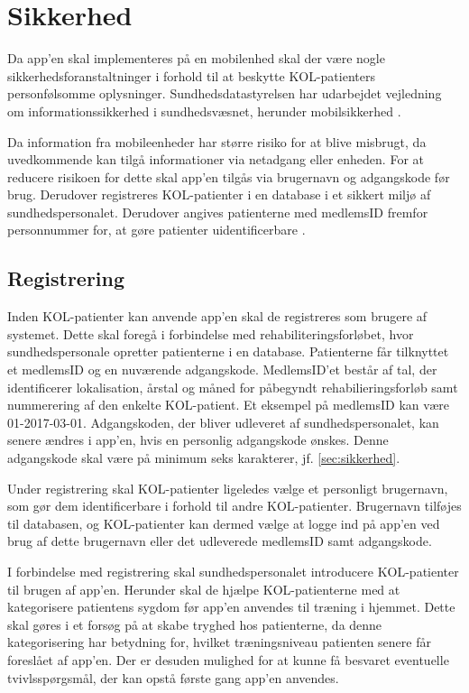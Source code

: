 \section{Sikkerhed}
Da app'en skal implementeres på en mobilenhed skal der være nogle sikkerhedsforanstaltninger i forhold til at beskytte KOL-patienters personfølsomme oplysninger. Sundhedsdatastyrelsen har udarbejdet vejledning om informationssikkerhed i sundhedsvæsnet, herunder mobilsikkerhed \cite{Sundhedsdatastyrelsen2016}.

Da information fra mobileenheder har større risiko for at blive misbrugt, da uvedkommende kan tilgå informationer via netadgang eller enheden. For at reducere risikoen for dette skal app'en tilgås via brugernavn og adgangskode før brug. Derudover registreres KOL-patienter i  en database i et sikkert miljø af sundhedspersonalet. Derudover angives patienterne med medlemsID fremfor personnummer for, at gøre patienter uidentificerbare \cite{Sundhedsdatastyrelsen2016}. 

\subsection{Registrering} \label{sec:registrering}
Inden KOL-patienter kan anvende app'en skal de registreres som brugere af systemet. Dette skal foregå i forbindelse med rehabiliteringsforløbet, hvor sundhedspersonale opretter patienterne i en database. Patienterne får tilknyttet et medlemsID og en nuværende adgangskode. MedlemsID'et består af tal, der identificerer lokalisation, årstal og måned for påbegyndt rehabilieringsforløb samt nummerering af den enkelte KOL-patient. Et eksempel på medlemsID kan være 01-2017-03-01.
Adgangskoden, der bliver udleveret af sundhedspersonalet, kan senere ændres i app'en, hvis en personlig adgangskode ønskes. Denne adgangskode skal være på minimum seks karakterer, jf. \autoref{sec:sikkerhed}.

Under registrering skal KOL-patienter ligeledes vælge et personligt brugernavn, som gør dem identificerbare i forhold til andre KOL-patienter. Brugernavn tilføjes til databasen, og KOL-patienter kan dermed vælge at logge ind på app'en ved brug af dette brugernavn eller det udleverede medlemsID samt adgangskode. 

I forbindelse med registrering skal sundhedspersonalet introducere KOL-patienter til brugen af app'en. Herunder skal de hjælpe KOL-patienterne med at kategorisere patientens sygdom før app'en anvendes til træning i hjemmet. Dette skal gøres i et forsøg på at skabe tryghed hos patienterne, da denne kategorisering har betydning for, hvilket træningsniveau patienten senere får foreslået af app'en. Der er desuden mulighed for at kunne få besvaret eventuelle tvivlsspørgsmål, der kan opstå første gang app'en anvendes. 
